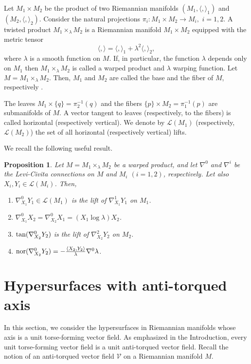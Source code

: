 \documentclass[12pt]{amsart}
\def\v{\mathcal V}
\newtheorem{proposition}[theorem]{Proposition}
\theoremstyle{definition}
\begin{document}
Let $M_1\times M_2$ be the product of two Riemannian manifolds $(M_1,\langle,\rangle_1)$ and $(M_2,\langle,\rangle_2)$. Consider the natural projections $\pi_i : M_1 \times M_2 \to M_i,$ $i=1,2
$. A twisted product $M_1 \times_{\lambda} M_2$ is a Riemannian manifold $M_1 \times M_2$ equipped with the metric tensor $$\langle, \rangle=\langle, \rangle_1+\lambda^2\langle, \rangle_2
,$$ where $\lambda$ is a smooth function on $M$. If, in particular, the function $\lambda$ depends only on $M_1$ then $M_1 \times_{\lambda} M_2$ is called a  warped product and $\lambda$ warping function. Let $M=M_1 \times_{\lambda} M_2$. Then, $M_1$ and $M_2$ are called the base and the fiber of $M$, respectively \cite{cbook}.

The leaves $M_1 \times \{ q\} = \pi_2^{-1}(q)$ and the fibers $\{p \} \times M_2 = \pi_1^{-1}(p)$ are submanifolds of $M$. A vector tangent to leaves (respectively, to the fibers) is called  horizontal (respectively vertical). We denote by $\mathcal{L}(M_1)$ (respectively, $\mathcal{L}(M_2)$) the set of all horizontal (respectively vertical) lifts.

We recall the following useful result.

\begin{proposition} \cite{cbook} \label{warp-con}
Let $M=M_1 \times_{\lambda} M_2$ be a warped product, and let $\nabla^0$ and $\nabla^i$ be the Levi-Civita connections on $M$ and $M_i$ $(i=1,2)$, respectively. Let also $X_i,Y_i \in \mathcal{L}(M_i)$. Then,
\begin{enumerate}
\item[(i)] $\nabla^0_{X_1}Y_1 \in \mathcal{L}(M_1) $ is the lift of $\nabla^1_{X_1}Y_1$ on $M_1$.
\item[(ii)] $\nabla^0_{X_1}X_2 =\nabla^0_{X_2}X_1 =(X_1 \log \lambda)X_2$.
\item[(iii)] $\textnormal{tan}(\nabla^0_{X_2}Y_2)$ is the lift of $\nabla^2_{X_2}Y_2$ on $M_2$.
\item[(iv)] $\textnormal{nor}(\nabla^0_{X_2}Y_2)=-\frac{\langle X_2,Y_2\rangle}{\lambda}\nabla^0\lambda$.
\end{enumerate}
\end{proposition}

\section{Hypersurfaces with anti-torqued axis} \label{anti}

In this section, we consider the hypersurfaces in Riemannian manifolds whose axis is a unit torse-forming vector field. As emphasized in the Introduction, every unit torse-forming vector field is a unit anti-torqued vector field. Recall  the notion of an anti-torqued vector field $\v$ on a Riemannian manifold $M$. 
\end{document}

